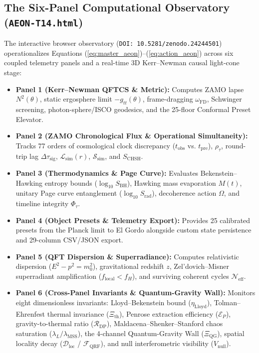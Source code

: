\documentclass[11pt,a4paper]{article}
\begin{document}
\subsection{The Six-Panel Computational Observatory (\texttt{AEON-T14.html})}
The interactive browser observatory (\texttt{DOI: 10.5281/zenodo.24244501}) operationalizes Equations (\ref{eq:master_aeon})--(\ref{eq:action_aeon}) across six coupled telemetry panels and a real-time 3D Kerr--Newman causal light-cone stage:
\begin{itemize}[leftmargin=1.5em]
    \item \textbf{Panel 1 (Kerr--Newman QFTCS \& Metric):} Computes ZAMO lapse $N^2(\theta)$, static ergosphere limit $-g_{tt}(\theta)$, frame-dragging $\omega_{\text{FD}}$, Schwinger screening, photon-sphere/ISCO geodesics, and the 25-floor Conformal Preset Elevator.
    \item \textbf{Panel 2 (ZAMO Chronological Flux \& Operational Simultaneity):} Tracks 77 orders of cosmological clock discrepancy ($t_{\text{obs}}$ vs. $t_{\text{pre}}$), $\rho_\tau$, round-trip lag $\Delta\tau_{\text{sig}}$, $\mathcal{L}_{\text{sim}}(r)$, $\mathcal{S}_{\text{sim}}$, and $S_{\text{CHSH}}$.
    \item \textbf{Panel 3 (Thermodynamics \& Page Curve):} Evaluates Bekenstein--Hawking entropy bounds ($\log_{10} S_{\text{BH}}$), Hawking mass evaporation $M(t)$, unitary Page curve entanglement ($\log_{10} S_{\text{rad}}$), decoherence action $\Omega$, and timeline integrity $\Phi_\tau$.
    \item \textbf{Panel 4 (Object Presets \& Telemetry Export):} Provides 25 calibrated presets from the Planck limit to El Gordo alongside custom state persistence and 29-column CSV/JSON export.
    \item \textbf{Panel 5 (QFT Dispersion \& Superradiance):} Computes relativistic dispersion ($E^2 - p^2 = m_0^2$), gravitational redshift $z$, Zel'dovich--Misner superradiant amplification ($f_{\text{local}} < f_H$), and surviving coherent cycles $\mathcal{N}_{\text{eff}}$.
    \item \textbf{Panel 6 (Cross-Panel Invariants \& Quantum-Gravity Wall):} Monitors eight dimensionless invariants: Lloyd--Bekenstein bound ($\eta_{\text{Lloyd}}$), Tolman--Ehrenfest thermal invariance ($\Xi_{\text{th}}$), Penrose extraction efficiency ($\mathcal{E}_P$), gravity-to-thermal ratio ($\mathcal{R}_{\text{DP}}$), Maldacena--Shenker--Stanford chaos saturation ($\lambda_L/\lambda_{\text{MSS}}$), the 4-channel Quantum-Gravity Wall ($\Xi_{\text{QG}}$), spatial locality decay ($\mathcal{D}_{\text{loc}}$ / $\mathcal{F}_{\text{QRF}}$), and null interferometric visibility ($V_{\text{null}}$).
\end{itemize}
\end{document}
